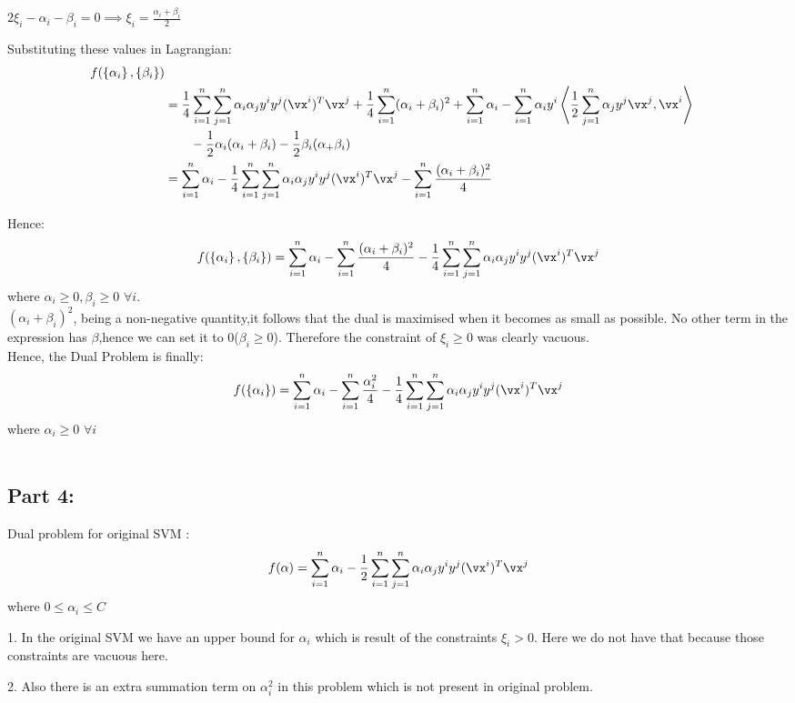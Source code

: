 \documentclass[a4paper,11pt]{article}
\begin{document}
\begin{mlsolution}
	$2\xi_i - \alpha_i - \beta_i = 0
	\implies \xi_i = \frac{\alpha_i + \beta_i}{2}$

Substituting these values in Lagrangian:
\begin{align*}
	f(\bc{\alpha_i}, \bc{\beta_i}) \\
			&= \frac{1}{4}\sum_{i=1}^{n}\sum_{j=1}^{n}\alpha_i\alpha_jy^iy^j(\vx^i)^T\vx^j + \frac{1}{4}\sum_{i=1}^{n}(\alpha_i +\beta_i)^2 +
			\sum_{i=1}^n\alpha_i
			- \sum_{i=1}^n \alpha_i y^i \ip{\frac{1}{2}\sum_{j=1}^{n} \alpha_j y^j \vx^j}{\vx^i}\\
			& \qquad-\frac{1}{2}\alpha_i(\alpha_i + \beta_i) -\frac{1}{2}\beta_i(\alpha_ + \beta_i)\\
			&= \sum_{i=1}^n \alpha_i -\frac{1}{4}\sum_{i=1}^{n}\sum_{j=1}^{n}\alpha_i\alpha_jy^iy^j(\vx^i)^T\vx^j - \sum_{i=1}^n\frac{(\alpha_i + \beta_i)^2}{4}
\end{align*}


Hence: $$f(\bc{\alpha_i}, \bc{\beta_i}) = \sum_{i=1}^n \alpha_i - \sum_{i=1}^n\frac{(\alpha_i + \beta_i)^2}{4} - \frac{1}{4} \sum_{i=1}^{n}\sum_{j=1}^{n}\alpha_i\alpha_jy^iy^j(\vx^i)^T\vx^j$$ where $\alpha_i \geq 0, \beta_i \geq 0$ $ \forall i$.\\
$(\alpha_i + \beta_i)^2$, being a non-negative quantity,it follows that the dual is maximised when it becomes as small as possible. No other term in the expression has $\beta$,hence we can set it to 0($\beta_i \geq 0$). Therefore the constraint of $\xi_i \geq 0$ was clearly vacuous. \\
Hence, the Dual Problem is finally:
$$ f(\bc{\alpha_i}) = \sum_{i=1}^n \alpha_i - \sum_{i=1}^n\frac{\alpha_i^2}{4} - \frac{1}{4} \sum_{i=1}^{n}\sum_{j=1}^{n}\alpha_i\alpha_jy^iy^j(\vx^i)^T\vx^j$$ where $\alpha_i \geq 0$ $\forall i$ 
\\ \\ 
\subsection{Part 4:}

Dual problem for original SVM :
$$f(\alpha) = \sum_{i=1}^n \alpha_i - \frac{1}{2} \sum_{i=1}^{n}\sum_{j=1}^{n}\alpha_i\alpha_jy^iy^j(\vx^i)^T\vx^j$$
where $0 \leq \alpha_i \leq C$

1. In the original SVM we have an upper bound for $\alpha_i$ which is result of the constraints $\xi_i > 0$. Here we do not have that because those constraints are vacuous here.

2. Also there is an extra summation term on $\alpha_i^2$ in this problem which is not present in original problem.


\end{mlsolution}
\end{document}
